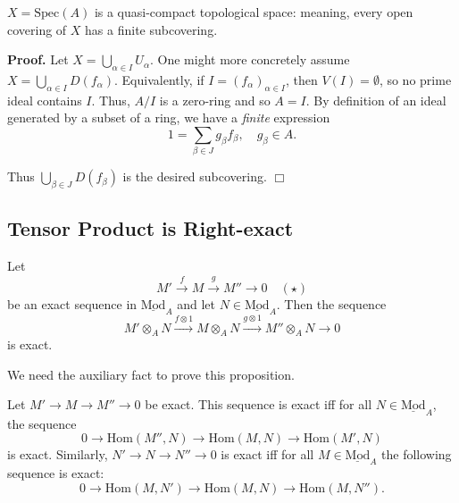 \documentclass{template}
\newcommand{\qedwhite}{\hfill \ensuremath{\Box}}
\begin{document}
\begin{lemma}
    $X=\text{Spec}(A)$ is a quasi-compact topological space: meaning, every open
    covering of $X$ has a finite subcovering.
\end{lemma}

\textbf{Proof.} Let $X = \bigcup_{\alpha \in I}U_{\alpha}$. One might more
concretely assume $X = \bigcup_{\alpha \in I}D(f_{\alpha})$. Equivalently, if
$I=(f_{\alpha})_{\alpha \in I}$, then $V(I) = \emptyset$, so no prime ideal
contains $I$. Thus, $A/I$ is a zero-ring and so $A=I$. By definition of an ideal
generated by a subset of a ring, we have a \textit{finite} expression
\begin{equation*}
    1 = \sum_{\beta \in J}g_{\beta}f_{\beta}, \quad g_{\beta} \in A.
\end{equation*}

Thus $\bigcup_{\beta \in J}D(f_{\beta})$ is the desired subcovering. \qedwhite

\subsection{Tensor Product is Right-exact}

\begin{proposition}
    Let 
    \begin{equation*}
        M' \xrightarrow{f} M \xrightarrow{g} M'' \to 0 \quad (\star)
    \end{equation*}
    be an exact sequence in $\underline{\text{Mod}}_A$ and let 
    $N \in \underline{\text{Mod}}_A$. Then the sequence
    \begin{equation*}
        M' \otimes_A N \xrightarrow{f \otimes 1} M \otimes_A N \xrightarrow{g \otimes 1} M'' \otimes_A N \to 0
    \end{equation*}
    is exact.
\end{proposition}

We need the auxiliary fact to prove this proposition.

\begin{propositions}
    Let $M' \to M \to M'' \to 0$ be exact. This sequence is exact 
    iff for all $N \in \underline{\text{Mod}}_A$, the sequence
    \begin{equation*}
        0 \to \text{Hom}(M'', N) \to \text{Hom}(M, N) \to \text{Hom}(M', N)
    \end{equation*}
    is exact. Similarly, $N' \to N \to N'' \to 0$ is exact iff 
    for all $M \in \underline{\text{Mod}}_A$ the following sequence is exact:
    \begin{equation*}
        0 \to \text{Hom}(M, N') \to \text{Hom}(M, N) \to \text{Hom}(M, N'').
    \end{equation*}
\end{propositions}
\end{document}

